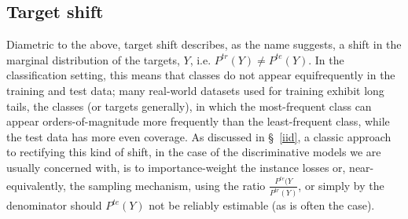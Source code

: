 \subsection{Target shift}\label{ssec:label-shift}
Diametric to the above, target shift describes, as the name suggests, a shift in the
marginal distribution of the targets, \(Y\), i.e. \( P^{tr}(Y) \neq P^{te}(Y) \).
%
In the classification setting, this means that classes do not appear equifrequently in the training
and test data; many real-world datasets used for training exhibit long tails, \wrt{} the classes
(or targets generally), in which the most-frequent class can appear orders-of-magnitude more
frequently than the least-frequent class, while the test data has more even coverage.
%
As discussed in \S~\ref{iid}, a classic approach to rectifying this kind of shift, in the case of
the discriminative models we are usually concerned with, is to  importance-weight the instance
losses or, near-equivalently, the sampling mechanism, using the ratio \(\frac{P^{te}(Y}{P^{tr}(Y)}
\), or simply by the denominator should \( P^{te}(Y)\) not be reliably estimable (as is often the
case).
%
%

